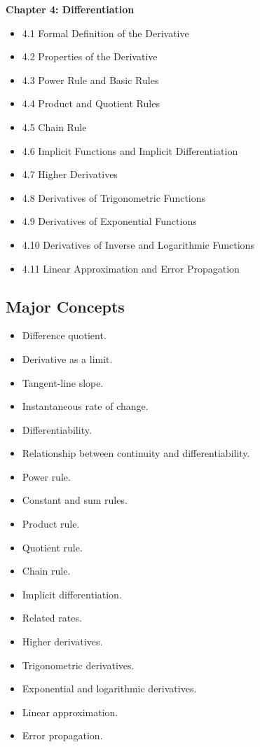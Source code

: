 \documentclass[11pt]{article}
\begin{document}
\textbf{Chapter 4: Differentiation}

\begin{itemize}
    \item 4.1 Formal Definition of the Derivative
    \item 4.2 Properties of the Derivative
    \item 4.3 Power Rule and Basic Rules
    \item 4.4 Product and Quotient Rules
    \item 4.5 Chain Rule
    \item 4.6 Implicit Functions and Implicit Differentiation
    \item 4.7 Higher Derivatives
    \item 4.8 Derivatives of Trigonometric Functions
    \item 4.9 Derivatives of Exponential Functions
    \item 4.10 Derivatives of Inverse and Logarithmic Functions
    \item 4.11 Linear Approximation and Error Propagation
\end{itemize}

\subsection{Major Concepts}

\begin{itemize}
    \item Difference quotient.
    \item Derivative as a limit.
    \item Tangent-line slope.
    \item Instantaneous rate of change.
    \item Differentiability.
    \item Relationship between continuity and differentiability.
    \item Power rule.
    \item Constant and sum rules.
    \item Product rule.
    \item Quotient rule.
    \item Chain rule.
    \item Implicit differentiation.
    \item Related rates.
    \item Higher derivatives.
    \item Trigonometric derivatives.
    \item Exponential and logarithmic derivatives.
    \item Linear approximation.
    \item Error propagation.
\end{itemize}
\end{document}
